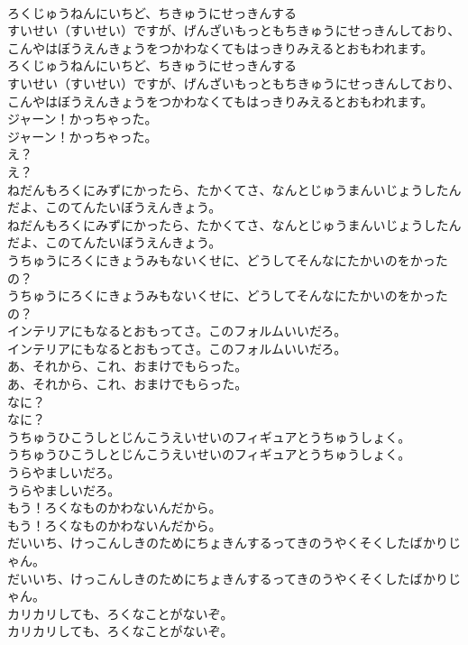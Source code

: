 \documentclass[8pt]{extreport}
\begin{document}
\begin{CJK}{UTF8}{min}
\\	ろくじゅうねんにいちど、ちきゅうにせっきんする
\\	すいせい（すいせい）ですが、げんざいもっともちきゅうにせっきんしており、こんやはぼうえんきょうをつかわなくてもはっきりみえるとおもわれます。
\\	ろくじゅうねんにいちど、ちきゅうにせっきんする
\\	すいせい（すいせい）ですが、げんざいもっともちきゅうにせっきんしており、こんやはぼうえんきょうをつかわなくてもはっきりみえるとおもわれます。
\\	ジャーン！かっちゃった。
\\	ジャーン！かっちゃった。
\\	え？
\\	え？
\\	ねだんもろくにみずにかったら、たかくてさ、なんとじゅうまんいじょうしたんだよ、このてんたいぼうえんきょう。
\\	ねだんもろくにみずにかったら、たかくてさ、なんとじゅうまんいじょうしたんだよ、このてんたいぼうえんきょう。
\\	うちゅうにろくにきょうみもないくせに、どうしてそんなにたかいのをかったの？
\\	うちゅうにろくにきょうみもないくせに、どうしてそんなにたかいのをかったの？
\\	インテリアにもなるとおもってさ。このフォルムいいだろ。
\\	インテリアにもなるとおもってさ。このフォルムいいだろ。
\\	あ、それから、これ、おまけでもらった。
\\	あ、それから、これ、おまけでもらった。
\\	なに？
\\	なに？
\\	うちゅうひこうしとじんこうえいせいのフィギュアとうちゅうしょく。
\\	うちゅうひこうしとじんこうえいせいのフィギュアとうちゅうしょく。
\\	うらやましいだろ。
\\	うらやましいだろ。
\\	もう！ろくなものかわないんだから。
\\	もう！ろくなものかわないんだから。
\\	だいいち、けっこんしきのためにちょきんするってきのうやくそくしたばかりじゃん。
\\	だいいち、けっこんしきのためにちょきんするってきのうやくそくしたばかりじゃん。
\\	カリカリしても、ろくなことがないぞ。
\\	カリカリしても、ろくなことがないぞ。

\end{CJK}
\end{document}
